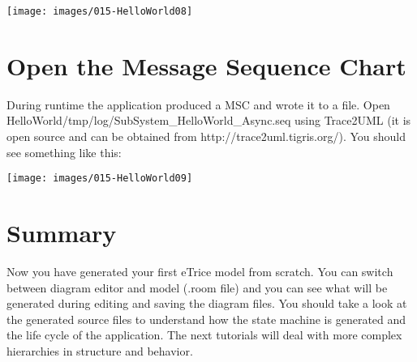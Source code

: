 \texttt{[image: images/015-HelloWorld08]}

\section{Open the Message Sequence Chart}

During runtime the application produced a MSC and wrote it to a file. Open HelloWorld/tmp/log/SubSystem\_HelloWorld\_Async.seq using Trace2UML (it is open source and can be obtained from  http://trace2uml.tigris.org/). You should see something like this:

\texttt{[image: images/015-HelloWorld09]}


\section{Summary}

Now you have generated your first eTrice model from scratch. You can switch between diagram editor and model (.room file) and you can see what will be generated during editing and saving the diagram files. 
You should take a look at the generated source files to understand how the state machine is generated and the life cycle of the application. The next tutorials will deal with more complex hierarchies in structure and behavior.
 